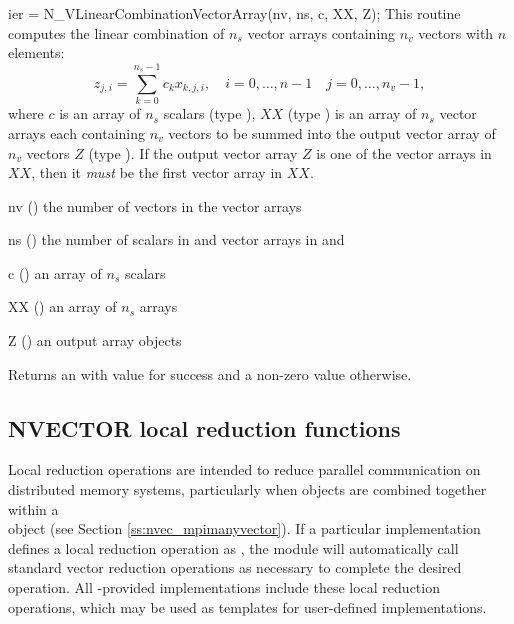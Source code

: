 {
  ier = N\_VLinearCombinationVectorArray(nv, ns, c, XX, Z);
}
{
  This routine computes the linear combination of $n_s$ vector arrays containing
  $n_v$ vectors with $n$ elements:
  \begin{equation*}
  z_{j,i} = \sum_{k=0}^{n_s-1} c_k x_{k,j,i}, \quad i=0,\ldots,n-1 \quad j=0,\ldots,n_v-1,
  \end{equation*}
  where $c$ is an array of $n_s$ scalars (type ), $XX$
  (type ) is an array of $n_s$ vector arrays each containing $n_v$
  vectors to be summed into the output vector array of $n_v$ vectors $Z$ (type
  ). If the output vector array $Z$ is one of the vector arrays in
  $XX$, then it \textit{must} be the first vector array in $XX$.
}
{ 
 \begin{args}[nv]
  \item[nv] () the number of vectors in the vector arrays
  \item[ns] () the number of scalars in  and vector arrays
    in  and 
  \item[c] () an array of $n_s$ scalars
  \item[XX] () an array of $n_s$ {\nvector} arrays
  \item[Z] () an output array {\nvector} objects
  \end{args}
}
{
  Returns an  with value  for success and a non-zero value otherwise.
}
{}

\subsection{NVECTOR local reduction functions}\label{ss:nveclocalops}

Local reduction operations are intended to reduce parallel
communication on distributed memory systems, particularly when
{\nvector} objects are combined together within a \\
{\nvecmpimanyvector} object (see Section \ref{ss:nvec_mpimanyvector}).  If a
particular {\nvector} implementation defines a local reduction
operation as , the {\nvecmpimanyvector} module will
automatically call standard vector reduction operations as necessary
to complete the desired operation. All {\sundials}-provided {\nvector}
implementations include these local reduction operations, which may be
used as templates for user-defined {\nvector} implementations.


